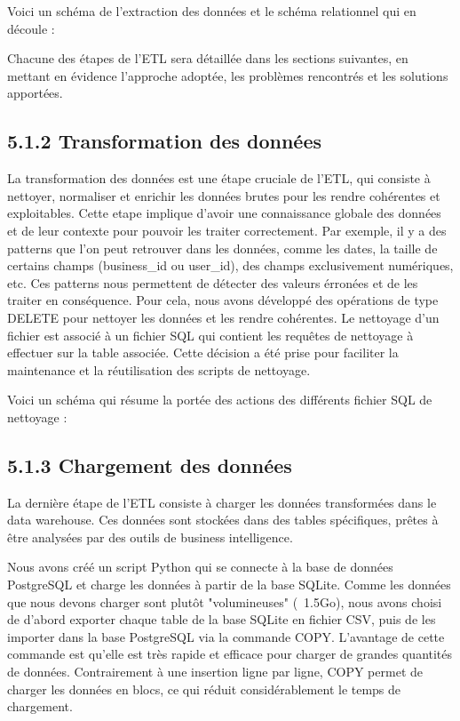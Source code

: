 Voici un schéma de l'extraction des données et le schéma relationnel qui en découle :


Chacune des étapes de l’ETL sera détaillée dans les sections suivantes, en mettant en évidence l'approche adoptée, les problèmes rencontrés et les solutions apportées.

\subsection{5.1.2 Transformation des données}

La transformation des données est une étape cruciale de l’ETL, qui consiste à nettoyer, normaliser et enrichir les données brutes pour les rendre cohérentes et exploitables.
Cette etape implique d'avoir une connaissance globale des données et de leur contexte pour pouvoir les traiter correctement.
Par exemple, il y a des patterns que l'on peut retrouver dans les données, comme les dates, la taille de certains champs (business_id ou user_id), des champs exclusivement numériques, etc.
Ces patterns nous permettent de détecter des valeurs érronées et de les traiter en conséquence.
Pour cela, nous avons développé des opérations de type DELETE pour nettoyer les données et les rendre cohérentes.
Le nettoyage d'un fichier est associé à un fichier SQL qui contient les requêtes de nettoyage à effectuer sur la table associée.
Cette décision a été prise pour faciliter la maintenance et la réutilisation des scripts de nettoyage.

Voici un schéma qui résume la portée des actions des différents fichier SQL de nettoyage :


\subsection{5.1.3 Chargement des données}

La dernière étape de l’ETL consiste à charger les données transformées dans le data warehouse. Ces données sont stockées dans des tables spécifiques, prêtes à être
analysées par des outils de business intelligence.

Nous avons créé un script Python qui se connecte à la base de données PostgreSQL et charge les données à partir de la base SQLite.
Comme les données que nous devons charger sont plutôt "volumineuses" (~1.5Go), nous avons choisi de d'abord exporter chaque table de la base SQLite en fichier CSV, puis de les
importer dans la base PostgreSQL via la commande COPY. L'avantage de cette commande est qu'elle est très rapide et efficace pour charger de grandes quantités de données.
Contrairement à une insertion ligne par ligne, COPY permet de charger les données en blocs, ce qui réduit considérablement le temps de chargement.

